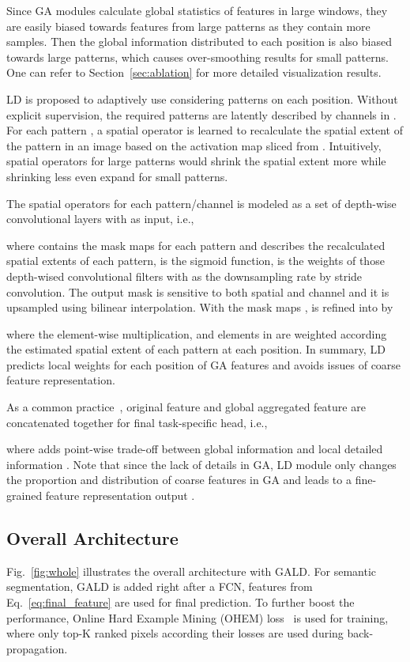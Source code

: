 \documentclass{bmvc2k}
\begin{document}
Since GA modules calculate global statistics of features in large windows, they are easily biased towards features from large patterns as they contain more samples. Then the global information distributed to each position is also biased towards large patterns, which causes over-smoothing results for small patterns. One can refer to Section~\ref{sec:ablation} for more detailed visualization results.

LD is proposed to adaptively use  considering patterns on each position. Without explicit supervision, the required patterns are latently described by  channels in . For each pattern , a spatial operator is learned to recalculate the spatial extent of the pattern in an image based on the activation map   sliced from . Intuitively, spatial operators for large patterns would shrink the spatial extent more while shrinking less even expand for small patterns.

The spatial operators for each pattern/channel is modeled as a set of depth-wise convolutional layers with  as input, i.e.,

where  contains the mask maps for each pattern and describes the recalculated spatial extents of each pattern,  is the sigmoid function,  is the weights of  those depth-wised convolutional filters with  as the downsampling rate by stride convolution. The output mask  is sensitive to both spatial and channel and it is upsampled using bilinear interpolation. With the mask maps ,  is refined into  by

where  the element-wise multiplication, and elements in  are weighted according the estimated spatial extent of each pattern at each position. In summary, LD predicts local weights  for each position of GA features
and avoids issues of coarse feature representation. 

As a common practice~\cite{pspnet}, original feature  and global aggregated feature  are concatenated together for final task-specific head, i.e.,

where  adds point-wise trade-off between global information  and local detailed information . Note that since the lack of details in GA, LD module only changes the proportion and distribution of coarse features in GA and leads to a fine-grained feature representation output .

\subsection{Overall Architecture}
Fig.~\ref{fig:whole} illustrates the overall architecture with GALD. For semantic segmentation, GALD is added right after a FCN, features from Eq.~\ref{eq:final_feature} are used for final prediction. To further boost the performance, Online Hard Example Mining (OHEM) loss~\cite{SegOHEM} is used for training, where only top-K ranked pixels according their losses are used during back-propagation.
\end{document}
